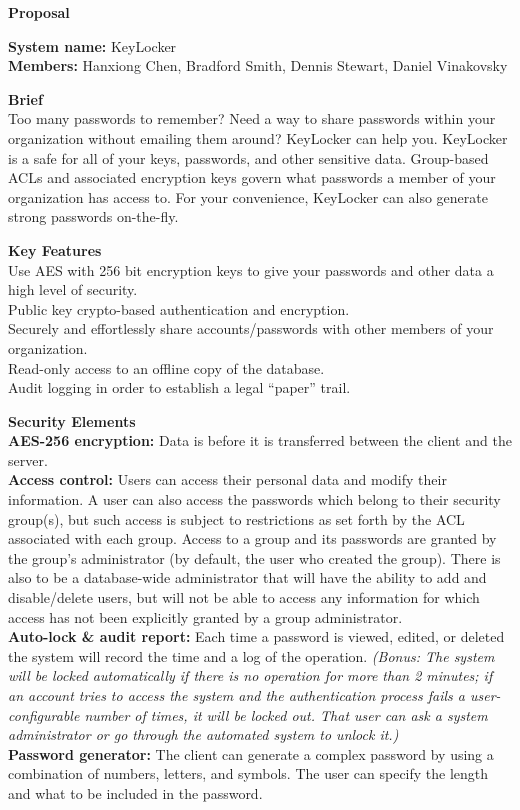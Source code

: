 \documentclass[11pt, letterpaper]{article}
\newcommand{\ProposalSection}[1]
{\noindent\textbf{#1}\\}
\newcommand{\IndentBullet}[1]
{\indent\textbullet{} #1\\}
\begin{document}
\centerline{\textbf{Proposal}}
\smallskip
\noindent\textbf{System name: }KeyLocker\\
\noindent\textbf{Members: }Hanxiong Chen, Bradford Smith, Dennis Stewart, Daniel Vinakovsky\\
\bigskip

\ProposalSection{Brief}
\noindent
Too many passwords to remember? Need a way to share passwords within your organization without emailing them around? KeyLocker can help you. KeyLocker is a safe for all of your keys, passwords, and other sensitive data. Group-based ACLs and associated encryption keys govern what passwords a member of your organization has access to. For your convenience, KeyLocker can also generate strong passwords on-the-fly.
\bigskip

\ProposalSection{Key Features}
\IndentBullet{Use AES with 256 bit encryption keys to give your passwords and other data a high level of security.}
\IndentBullet{Public key crypto-based authentication and encryption.}
\IndentBullet{Securely and effortlessly share accounts/passwords with other members of your organization.}
\IndentBullet{Read-only access to an offline copy of the database.}
\IndentBullet{Audit logging in order to establish a legal “paper” trail.}
\bigskip

\ProposalSection{Security Elements}
\IndentBullet{\textbf{AES-256 encryption: }Data is before it is transferred between the client and the server.}
\IndentBullet{\textbf{Access control: }Users can access their personal data and modify their information. A user can also access the passwords which belong to their security group(s), but such access is subject to restrictions as set forth by the ACL associated with each group. Access to a group and its passwords are granted by the group’s administrator (by default, the user who created the group). There is also to be a database-wide administrator that will have the ability to add and disable/delete users, but will not be able to access any information for which access has not been explicitly granted by a group administrator.}
\IndentBullet{\textbf{Auto-lock \& audit report: }Each time a password is viewed, edited, or deleted the system will record the time and a log of the operation. \textit{(Bonus: The system will be locked automatically if there is no operation for more than 2 minutes; if an account tries to access the system and the authentication process fails a user-configurable number of times, it will be locked out. That user can ask a system administrator or go through the automated system to unlock it.)}}
\IndentBullet{\textbf{Password generator: }The client can generate a complex password by using a combination of numbers, letters, and symbols. The user can specify the length and what to be included in the password.}
\bigskip
\end{document}
